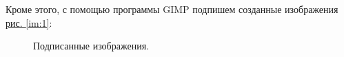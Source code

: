 \documentclass[12pt,a4paper]{scrartcl}
\begin{document}
Кроме этого, с помощью программы GIMP подпишем созданные изображения  \hyperref[im:1]{рис. \ref*{im:1}}:
\begin{figure}[h]
    \begin{minipage}[h]{0.49\linewidth}
    \end{minipage}
    \hfill
    \begin{minipage}[h]{0.49\linewidth}
    \end{minipage}
    \caption{Подписанные изображения.}
    \label{im:2}
\end{figure}
\newpage
\end{document}
